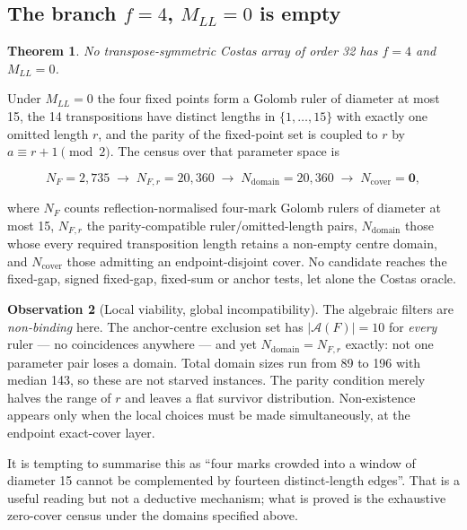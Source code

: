 \documentclass[11pt,a4paper]{article}
\newtheorem{theorem}{Theorem}[section]
\theoremstyle{definition}
\newtheorem{observation}[theorem]{Observation}
\begin{document}
\subsection{The branch $f=4$, $M_{LL}=0$ is empty}
\label{sec:f4closed}

\begin{theorem}
\label{thm:f4closed}
No transpose-symmetric Costas array of order 32 has $f=4$ and $M_{LL}=0$.
\end{theorem}

Under $M_{LL}=0$ the four fixed points form a Golomb ruler of diameter at most
15, the 14 transpositions have distinct lengths in $\{1,\dots,15\}$ with exactly
one omitted length $r$, and the parity of the fixed-point set is coupled to $r$
by $a\equiv r+1\pmod2$. The census over that parameter space is

\[
N_F=2{,}735 \;\longrightarrow\; N_{F,r}=20{,}360
\;\longrightarrow\; N_{\mathrm{domain}}=20{,}360
\;\longrightarrow\; N_{\mathrm{cover}}=\mathbf 0 ,
\]

where $N_F$ counts reflection-normalised four-mark Golomb rulers of diameter at
most 15, $N_{F,r}$ the parity-compatible ruler/omitted-length pairs,
$N_{\mathrm{domain}}$ those whose every required transposition length retains a
non-empty centre domain, and $N_{\mathrm{cover}}$ those admitting an
endpoint-disjoint cover. No candidate reaches the fixed-gap, signed fixed-gap,
fixed-sum or anchor tests, let alone the Costas oracle.

\begin{observation}[Local viability, global incompatibility]
\label{obs:f4local}
The algebraic filters are \emph{non-binding} here. The anchor-centre exclusion
set has $|\mathcal A(F)|=10$ for \emph{every} ruler --- no coincidences anywhere
--- and yet $N_{\mathrm{domain}}=N_{F,r}$ exactly: not one parameter pair loses a
domain. Total domain sizes run from 89 to 196 with median 143, so these are not
starved instances. The parity condition merely halves the range of $r$ and leaves
a flat survivor distribution. Non-existence appears only when the local choices
must be made simultaneously, at the endpoint exact-cover layer.
\end{observation}

It is tempting to summarise this as ``four marks crowded into a window of
diameter 15 cannot be complemented by fourteen distinct-length edges''. That is a
useful reading but not a deductive mechanism; what is proved is the exhaustive
zero-cover census under the domains specified above.
\end{document}
